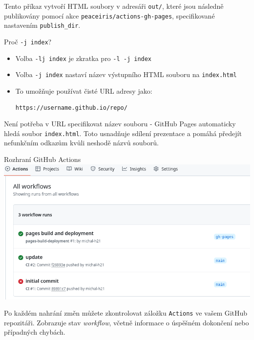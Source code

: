 Tento příkaz vytvoří HTML soubory v adresáři \texttt{out/}, které jsou následně publikovány
pomocí akce \texttt{peaceiris/actions-gh-pages}, specifikované nastavením
\texttt{publish_dir}.

\begin{frame}[fragile]{Proč \texttt{-j index}?}
\begin{itemize}
\item Volba \texttt{-lj index} je zkratka pro \texttt{-l -j index}
\item Volba \texttt{-j index} nastaví název výstupního HTML souboru na \texttt{index.html}
\item To umožňuje používat čisté URL adresy jako:

\begin{verbatim}
https://username.github.io/repo/
\end{verbatim}

\end{itemize}
\end{frame}

Není potřeba v URL specifikovat název souboru - GitHub Pages
automaticky hledá soubor \texttt{index.html}. Toto usnadňuje sdílení
prezentace a pomáhá předejít nefunkčním odkazům kvůli neshodě názvů souborů.



\begin{frame}[fragile]{Rozhraní GitHub Actions}
\includegraphics[width=\textwidth]{img/github-actions.png}
\end{frame}

Po každém nahrání změn  můžete zkontrolovat záložku
\texttt{Actions} ve vašem GitHub repozitáři. Zobrazuje stav \textit{workflow}, včetně
informace o úspěšném dokončení nebo případných chybách.

